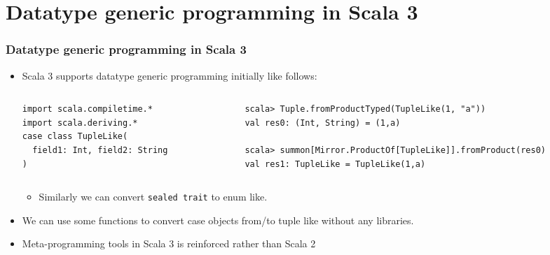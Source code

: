 \section{Datatype generic programming in Scala 3}

\begin{frame}[fragile]
  \frametitle{Datatype generic programming in Scala 3}

  \begin{itemize}
    \item Scala 3 supports datatype generic programming initially like follows:
    \begin{columns}
      \begin{column}{0.32\textwidth}
\begin{lstlisting}[style=scala]
import scala.compiletime.*
import scala.deriving.*
case class TupleLike(
  field1: Int, field2: String
)
\end{lstlisting}
      \end{column}
      \begin{column}{0.6\textwidth}
\begin{lstlisting}[style=scala]
scala> Tuple.fromProductTyped(TupleLike(1, "a"))
val res0: (Int, String) = (1,a)

scala> summon[Mirror.ProductOf[TupleLike]].fromProduct(res0)
val res1: TupleLike = TupleLike(1,a)
\end{lstlisting}
      \end{column}
    \end{columns}
    \begin{itemize}
      \item Similarly we can convert \lstinline|sealed trait| to enum like.
    \end{itemize}

    \item We can use some functions to convert case objects from/to tuple like without any libraries.

    \item Meta-programming tools in Scala 3 is reinforced rather than Scala 2
  \end{itemize}

\end{frame}

